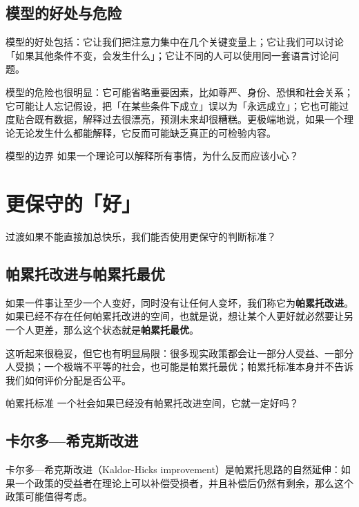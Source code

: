 \documentclass[10pt,a4paper]{ctexart}
\newcommand{\transitionnote}[1]{\begin{conceptbox}{过渡}#1\end{conceptbox}}
\begin{document}
\subsection{模型的好处与危险}

模型的好处包括：它让我们把注意力集中在几个关键变量上；它让我们可以讨论「如果其他条件不变，会发生什么」；它让不同的人可以使用同一套语言讨论问题。

模型的危险也很明显：它可能省略重要因素，比如尊严、身份、恐惧和社会关系；它可能让人忘记假设，把「在某些条件下成立」误以为「永远成立」；它也可能过度贴合既有数据，解释过去很漂亮，预测未来却很糟糕。更极端地说，如果一个理论无论发生什么都能解释，它反而可能缺乏真正的可检验内容。

\begin{discussionbox}{模型的边界}
如果一个理论可以解释所有事情，为什么反而应该小心？
\end{discussionbox}

\section{更保守的「好」}

\transitionnote{如果不能直接加总快乐，我们能否使用更保守的判断标准？}

\subsection{帕累托改进与帕累托最优}

如果一件事让至少一个人变好，同时没有让任何人变坏，我们称它为\textbf{帕累托改进}。如果已经不存在任何帕累托改进的空间，也就是说，想让某个人更好就必然要让另一个人更差，那么这个状态就是\textbf{帕累托最优}。

这听起来很稳妥，但它也有明显局限：很多现实政策都会让一部分人受益、一部分人受损；一个极端不平等的社会，也可能是帕累托最优；帕累托标准本身并不告诉我们如何评价分配是否公平。

\begin{discussionbox}{帕累托标准}
一个社会如果已经没有帕累托改进空间，它就一定好吗？
\end{discussionbox}

\subsection{卡尔多—希克斯改进}

卡尔多—希克斯改进（Kaldor-Hicks improvement）是帕累托思路的自然延伸：如果一个政策的受益者在理论上可以补偿受损者，并且补偿后仍然有剩余，那么这个政策可能值得考虑。
\end{document}

